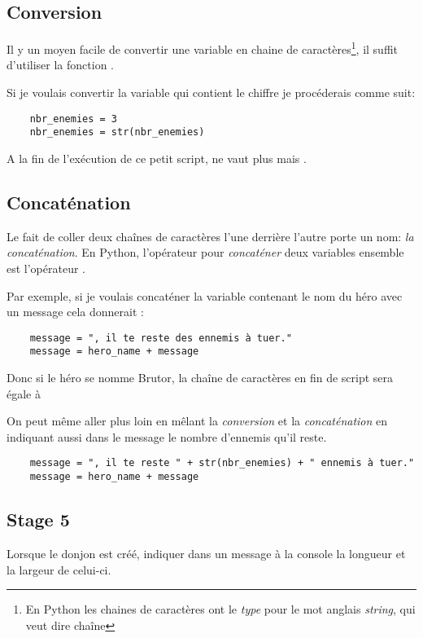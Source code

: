\subsection{Conversion}
Il y un moyen facile de convertir une variable en chaine de caractères\footnote{En Python les chaines de caractères ont le \emph{type}  pour le mot anglais \textit{string}, qui veut dire chaîne}, il suffit d'utiliser la fonction .

Si je voulais convertir la variable  qui contient le chiffre  je procéderais comme suit:

\begin{lstlisting}
	nbr_enemies = 3
	nbr_enemies = str(nbr_enemies)
\end{lstlisting}

A la fin de l'exécution de ce petit script,  ne vaut plus  mais .

\subsection{Concaténation}
Le fait de coller deux chaînes de caractères l'une derrière l'autre porte un nom: \emph{la concaténation}.
En Python, l'opérateur pour \emph{concaténer} deux variables ensemble est l'opérateur \codeintext{+}.

Par exemple, si je voulais concaténer la variable contenant le nom du héro avec un message cela donnerait :
 
\begin{lstlisting}
	message = ", il te reste des ennemis à tuer."
	message = hero_name + message
\end{lstlisting}

Donc si le héro se nomme Brutor, la chaîne de caractères en fin de script sera égale à 

On peut même aller plus loin en mêlant la \emph{conversion} et la \emph{concaténation} en indiquant aussi dans le message le nombre d'ennemis qu'il reste.

\begin{lstlisting}
	message = ", il te reste " + str(nbr_enemies) + " ennemis à tuer."
	message = hero_name + message
\end{lstlisting}

\subsection{Stage 5}
Lorsque le donjon est créé, indiquer dans un message à la console la longueur et la largeur de celui-ci.

